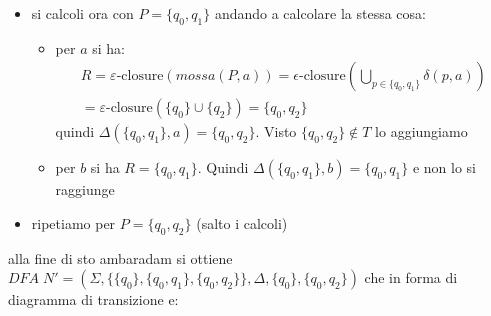 {\begin{itemize}
\begin{itemize}
            Si definisca $\delta(S,a)=\{q_0\}$ e visto che $\{q_0\}\in T$ non lo andiamo a ri-aggiungere
            \item per il carattere $a$ calcoliamo con $P=S=\{q_0\}$:
              \[
                \begin{array}{l}
                    R = \varepsilon\text{-closure}(mossa(P,b)) = \epsilon\text{-closure}\left(\bigcup_{p\in\{q_0\}}\delta (p,b)\right) \\                
                    =\varepsilon\text{-closure}(\delta(q_0,b)) =\epsilon\text{-closure}(\{q_0, q_1\}) =\{q_0,q_1\}
                \end{array}
              \]
            visto che $\{q_0,q_1\}\notin T$ lo andiamo ad aggiungere
        \end{itemize}
        \item si calcoli ora con $P=\{q_0, q_1\}$ andando a calcolare la stessa cosa:
        \begin{itemize}
            \item per $a$ si ha:
              \[
                \begin{array}{l}
                    R=    \varepsilon\text{-closure} (mossa(P,a)) = \epsilon\text{-closure}\left(\bigcup_{p\in\{q_0, q_1\}}\delta(p,a)\right)\\                 
                    = \varepsilon\text{-closure} (\{q_0\}\cup\{ q_2\}) = \{q_0,q_2\}
                \end{array}
              \]
            quindi $\Delta(\{q_0,q_1\}, a)=\{q_0,q_2\}$. Visto $\{q_0,q_2\}\notin T$ lo aggiungiamo 
            \item  per $b$ si ha $R=\{q_0,q_1\}$. Quindi $\Delta(\{q_0, q_1\}, b) = \{q_0,q_1\}$ e non lo si raggiunge
        \end{itemize}
        \item ripetiamo per $P=\{q_0, q_2\}$ (salto i calcoli)
    \end{itemize}

    alla fine di sto ambaradam si ottiene $DFA \;N'=(\Sigma, \{\{q_0\},\{q_0,q_1\}, \{q_0,q_2\}\}, \Delta, \{q_0\}, \{q_0,q_2\})$ che in forma di diagramma di transizione e:
    \begin{center}
\end{center}}
